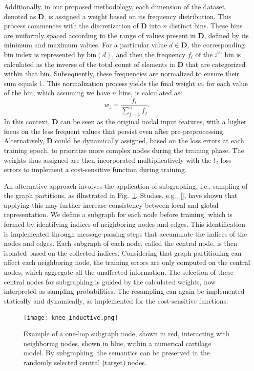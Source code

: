 \documentclass[12pt,a4paper]{report}
\begin{document}
Additionally, in our proposed methodology, each dimension of the dataset, denoted as \( \mathbf{D} \), is assigned a weight based on its frequency distribution. This process commences with the discretization of \( \mathbf{D} \) into \( n \) distinct bins. These bins are uniformly spaced according to the range of values present in \( \mathbf{D} \), defined by its minimum and maximum values. For a particular value \( d \in \mathbf{D} \), the corresponding bin index is represented by \( \text{bin}(d) \), and then the frequency \( f_i \) of the \( i^\text{th} \) bin is calculated as the inverse of the total count of elements in \( \mathbf{D} \) that are categorized within that bin. Subsequently, these frequencies are normalized to ensure their sum equals 1. This normalization process yields the final weight \( w_i \) for each value of the bin, which assuming we have $n$ bins, is calculated as:
%
\begin{equation}
    w_i = \frac{f_i}{\sum_{j=1}^{n} f_j}.
\end{equation}
%
In this context, \( \mathbf{D} \) can be seen as the original nodal input features, with a higher focus on the less frequent values that persist even after pre-preprocessing. Alternatively, \( \mathbf{D} \) could be dynamically assigned, based on the loss errors at each training epoch, to prioritize more complex nodes during the training phase. The weights thus assigned are then incorporated multiplicatively with the \( l_2 \) loss errors to implement a cost-sensitive function during training.

An alternative approach involves the application of subgraphing, i.e., sampling of the graph partitions, as illustrated in Fig.~\ref{fig:knee_inductive}. Studies, e.g., [\cite{you2020,sun2020,velickovic2018}], have shown that applying this may further increase consistency between local and global representation. We define a subgraph for each node before training, which is formed by identifying indices of neighboring nodes and edges. This identification is implemented through message-passing steps that accumulate the indices of the nodes and edges. Each subgraph of each node, called the central node, is then isolated based on the collected indices. Considering that graph partitioning can affect each neighboring node, the training errors are only computed on the central nodes, which aggregate all the unaffected information. The selection of these central nodes for subgraphing is guided by the calculated weights, now interpreted as sampling probabilities. The resampling can again be implemented statically and dynamically, as implemented for the cost-sensitive functions.
%
\begin{figure}\centering
\texttt{[image: knee\_inductive.png]}
\caption{Example of a one-hop subgraph node, shown in red, interacting with neighboring nodes, shown in blue, within a numerical cartilage model. By subgraphing, the semantics can be preserved in the randomly selected central (target) nodes.}\label{fig:knee_inductive}
\end{figure}
\end{document}
